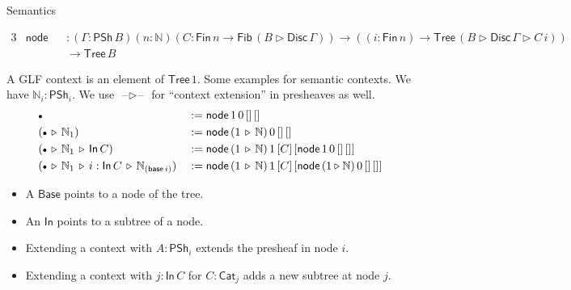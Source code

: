 \documentclass[dvipsnames,aspectratio=169]{beamer}
\newcommand{\ms}[1]{\mathsf{#1}}
\newcommand{\mbb}[1]{\mathbb{#1}}
\newcommand{\blank}{\mathord{\hspace{1pt}\text{--}\hspace{1pt}}}
\newcommand{\Fib}{\mathsf{Fib}}
\newcommand{\Fin}{\mathsf{Fin}}
\newcommand{\Tree}{\mathsf{Tree}}
\newcommand{\Disc}{\mathsf{Disc}}
\newcommand{\Base}{\mathsf{Base}}
\newcommand{\In}{\mathsf{In}}
\newcommand{\PSh}{\mathsf{PSh}}
\newcommand{\Cat}{\mathsf{Cat}}
\newcommand{\base}{\mathsf{base}}
\newcommand{\ext}{\triangleright}
\newcommand{\emptycon}{\scaleobj{.75}\bullet}
\begin{document}
\begin{frame}{Semantics}

\begin{block}{}
\vspace{-1em}
{\small
\begin{alignat*}{3}
  & \ms{node} &&: (\Gamma : \PSh\,B)(n : \mbb{N})(C : \Fin\,n \to \Fib\,(B \ext \Disc\,\Gamma)) \to ((i : \Fin\,n) \to \Tree\,(B \ext \Disc\,\Gamma \ext C\,i)) \\
  & &&\to \Tree\,B
\end{alignat*}
}
\end{block}
\vspace{0.5em}

A GLF context is an element of $\Tree\,1$. Some examples for semantic contexts. We have $\mbb{N}_i : \PSh_i$. We use $\blank\ext\blank$ for ``context extension'' in presheaves as well.
\begin{alignat*}{3}
  & \emptycon &&:= \ms{node}\,1\,0\,[]\,[]\\
  & (\emptycon\,\ext\,\mbb{N}_1) &&:= \ms{node}\,(1\,\ext\,\mbb{N})\,0\,[]\,[]\\
  & (\emptycon\,\ext\,\mbb{N}_1\,\ext\,\In\,C) &&:= \ms{node}\,(1\,\ext\,\mbb{N})\,1\,[C]\,[\ms{node}\,1\,0\,[]\,[]]\\
  & (\emptycon\,\ext\,\mbb{N}_1\,\ext\,i : \In\,C\,\ext\,\mbb{N}_{(\base\,i)}) &&:= \ms{node}\,(1\,\ext\,\mbb{N})\,1\,[C]\,[\ms{node}\,(1 \ext \mbb{N})\,0\,[]\,[]]
\end{alignat*}
\vspace{-1em}
\pause

\begin{itemize}
\item A $\Base$ points to a node of the tree.
\item An $\In$ points to a subtree of a node.
\item Extending a context with $A : \PSh_i$ extends the presheaf in node $i$.
\item Extending a context with $j : \In\,C$ for $C : \Cat_j$ adds a new subtree at node $j$.
\end{itemize}


\end{frame}
\end{document}
